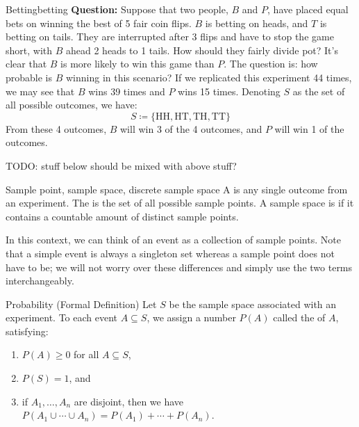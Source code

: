\begin{exbox}{Betting}{betting}
    \textbf{Question:} Suppose that two people, $B$ and $P$, have placed equal bets on winning the best of 5 fair coin flips. $B$ is betting on heads, and $T$ is betting on tails. They are interrupted after 3 flips and have to stop the game short, with $B$ ahead 2 heads to 1 tails. How should they fairly divide pot?
    \tcblower
    It's clear that $B$ is more likely to win this game than $P$. The question is: how probable is $B$ winning in this scenario? If we replicated this experiment 44 times, we may see that $B$ wins 39 times and $P$ wins 15 times. Denoting $S$ as the set of all possible outcomes, we have:
    \[ S \coloneq \{ \text{HH}, \text{HT}, \text{TH}, \text{TT} \} \]
    From these 4 outcomes, $B$ will win 3 of the 4 outcomes, and $P$ will win 1 of the  outcomes.
\end{exbox}

TODO: stuff below should be mixed with above stuff?

\begin{dfnbox}{Sample point, sample space, discrete sample space}{}
    A  is any single outcome from an experiment. The  is the set of all possible sample points. A sample space is  if it contains a countable amount of distinct sample points.
\end{dfnbox}

In this context, we can think of an event as a collection of sample points. Note that a simple event is always a singleton set whereas a sample point does not have to be; we will not worry over these differences and simply use the two terms interchangeably.

\begin{dfnbox}{Probability (Formal Definition)}{}
    Let $S$ be the sample space associated with an experiment. To each event $A \subseteq S$, we assign a number $P(A)$ called the  of $A$, satisfying:
    \begin{enumerate}
        \item $P(A) \geq 0$ for all $A \subseteq S$,
        \item $P(S) = 1$, and
        \item if $A_1, \ldots, A_n$ are disjoint, then we have $P(A_1 \cup \cdots \cup A_n) = P(A_1) + \cdots + P(A_n)$.
    \end{enumerate}
\end{dfnbox}


